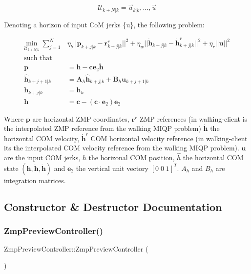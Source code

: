 \[ \mathcal{U}_{k+N|k} = {\vec{u}_{k|k}, ... , \vec{u}} \]

Denoting a horizon of input CoM jerks \{u\}, the following problem\+:

\begin{align*} \underset{\mathcal{U}_{k+N|k}}{\text{min}} \; \sum_{j=1}^{N} & \eta_b || \mathbf{p}_{k+j|k} - \mathbf{r}_{k+j|k}^r ||^2 + \eta_w ||\mathbf{\dot{h}}_{k+j|k} - \dot{\mathbf{h}}^r_{k+j|k} ||^2 + \eta_r || \mathbf{u} ||^2 \\ \text{such that}&\\ \mathbf{p} &= \mathbf{h} - \mathbf{c}\mathbf{e}_2 \mathbf{\ddot{h}} \\ \mathbf{\hat{h}}_{k+j+1|k} &= \mathbf{A}_h \hat{\mathbf{h}}_{k+j|k} + \mathbf{B}_h \mathbf{u}_{k+j+1|k} \\ \mathbf{h}_{k+j|k} &= \mathbf{h}_k\\ \mathbf{h} &= \mathbf{c} - (\mathbf{c}\cdot\mathbf{e}_2)\mathbf{e}_2 \end{align*}

Where $\mathbf{p}$ are horizontal Z\+MP coordinates, $ \mathbf{r}^r $ Z\+MP references (in walking-\/client is the interpolated Z\+MP reference from the walking M\+I\+QP problem) $ \mathbf{\dot{h}} $ the horizontal C\+OM velocity, $ \mathbf{\dot{h}}^r $ C\+OM horizontal velocity reference (in walking-\/client it\textquotesingle{}s the interpolated C\+OM velocity reference from the walking M\+I\+QP problem). $\mathbf{u}$ are the input C\+OM jerks, $h$ the horizonal C\+OM position, $\hat{h}$ the horizontal C\+OM state $ (\mathbf{h}, \mathbf{\dot{h}}, \mathbf{\ddot{h}}) $ and $\mathbf{e}_2$ the vertical unit vectory $ [0\;0\;1]^T$. $A_h$ and $B_h$ are integration matrices. 

\subsection{Constructor \& Destructor Documentation}
\hypertarget{classZmpPreviewController_ac8837fd39b0b942afd3dd5759c456b42}{}\label{classZmpPreviewController_ac8837fd39b0b942afd3dd5759c456b42} 
\subsubsection{\texorpdfstring{Zmp\+Preview\+Controller()}{ZmpPreviewController()}}
{\footnotesize\ttfamily Zmp\+Preview\+Controller\+::\+Zmp\+Preview\+Controller (\begin{DoxyParamCaption}{ }\end{DoxyParamCaption})}

